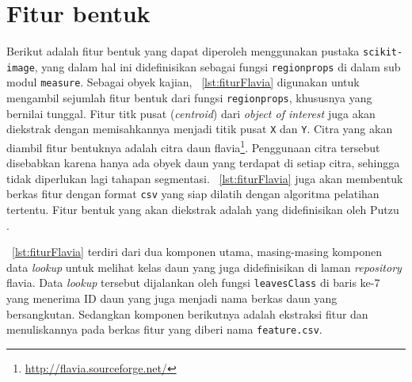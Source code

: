  
 \section{Fitur bentuk}
 \label{sec:regionprops}
Berikut adalah fitur bentuk yang dapat diperoleh menggunakan pustaka \texttt{scikit-image}, yang dalam hal ini didefinisikan sebagai fungsi \texttt{regionprops} di dalam sub modul \texttt{measure}. Sebagai obyek kajian, \lstlistingname~\ref{lst:fiturFlavia} digunakan untuk mengambil sejumlah fitur bentuk dari fungsi \texttt{regionprops}, khususnya yang bernilai tunggal. Fitur titk pusat (\textit{centroid}) dari \textit{object of interest} juga akan diekstrak dengan memisahkannya menjadi titik pusat \texttt{X} dan \texttt{Y}. Citra yang akan diambil fitur bentuknya adalah citra daun flavia\footnote{\url{http://flavia.sourceforge.net/}}. Penggunaan citra tersebut disebabkan karena hanya ada obyek daun yang terdapat di setiap citra, sehingga tidak diperlukan lagi tahapan segmentasi. \lstlistingname~\ref{lst:fiturFlavia} juga akan membentuk berkas fitur dengan format \texttt{csv} yang siap dilatih dengan algoritma pelatihan tertentu. Fitur bentuk yang akan diekstrak adalah yang didefinisikan oleh Putzu \cite{PUTZU2014179}.

\lstlistingname~\ref{lst:fiturFlavia} terdiri dari dua komponen utama, masing-masing komponen data \textit{lookup} untuk melihat kelas daun yang juga didefinisikan di laman \textit{repository} flavia. Data \textit{lookup} tersebut dijalankan oleh fungsi \texttt{leavesClass} di baris ke-7 yang menerima ID daun yang juga menjadi nama berkas daun yang bersangkutan. Sedangkan komponen berikutnya adalah ekstraksi fitur dan menuliskannya pada berkas fitur yang diberi nama \texttt{feature.csv}. 

\scriptsize

\normalsize
